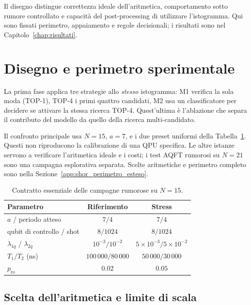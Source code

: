 \begin{onehalfspace}

Il disegno distingue correttezza ideale dell'aritmetica, comportamento sotto
rumore controllato e capacità del post-processing di utilizzare l'istogramma.
Qui sono fissati perimetro, appaiamento e regole decisionali; i risultati sono
nel Capitolo~\ref{chap:risultati}.

\section{Disegno e perimetro sperimentale}
\label{sec:obiettivi_sperimentali}

La prima fase applica tre strategie allo \emph{stesso} istogramma: M1 verifica
la sola moda (TOP-1), TOP-4 i primi quattro candidati, M2 usa un classificatore
per decidere se attivare la stessa ricerca TOP-4. Quest'ultima è l'ablazione che
separa il contributo del modello da quello della ricerca multi-candidato.

Il confronto principale usa $N=15$, $a=7$, e i due preset uniformi della Tabella~\ref{tab:contratto_n15}. Questi non riproducono la calibrazione di una QPU specifica. Le altre istanze servono a verificare l'aritmetica ideale e i costi; i test AQFT rumorosi su $N=21$ sono una campagna esplorativa separata. Scelte aritmetiche e perimetro completo sono nella Sezione~\ref{app:shor_perimetro_esteso}.

\begin{table}[!htbp]
\centering
\small
\caption{Contratto essenziale delle campagne rumorose su $N=15$.}
\label{tab:contratto_n15}
\begin{tabular}{lcc}
\toprule
\textbf{Parametro} & \textbf{Riferimento} & \textbf{Stress} \\
\midrule
$a$ / periodo atteso & $7/4$ & $7/4$ \\
qubit di controllo / shot & $8/1024$ & $8/1024$ \\
$\lambda_{1q}$ / $\lambda_{2q}$ & $10^{-3}/10^{-2}$ & $5\!\times\!10^{-3}/5\!\times\!10^{-2}$ \\
$T_1/T_2$ (ns) & $100\,000/80\,000$ & $50\,000/30\,000$ \\
$p_{\mathrm{ro}}$ & $0.02$ & $0.05$ \\
\bottomrule
\end{tabular}
\end{table}

\subsection{Scelta dell'aritmetica e limite di scala}
\label{sec:scelta_aritmetica}


\end{onehalfspace}

